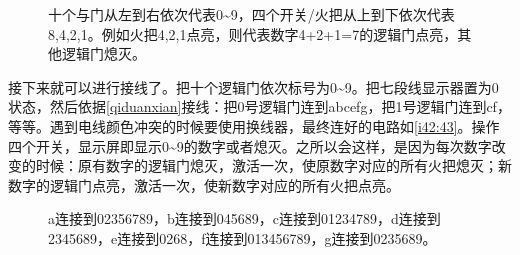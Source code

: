 \begin{figure}[!ht]
\begin{center}
\quad
{}
\end{center}
\caption{十个与门从左到右依次代表0\~{}9，四个开关/火把从上到下依次代表8,4,2,1。例如火把4,2,1点亮，则代表数字4+2+1=7的逻辑门点亮，其他逻辑门熄灭。}
\label{i36:37}
\end{figure}

接下来就可以进行接线了。把十个逻辑门依次标号为0\~{}9。把七段线显示器置为0状态，然后依据\autoref{qiduanxian}接线：把0号逻辑门连到abcefg，把1号逻辑门连到cf，等等。遇到电线颜色冲突的时候要使用换线器，最终连好的电路如\autoref{i42:43}。操作四个开关，显示屏即显示0\~{}9的数字或者熄灭。之所以会这样，是因为每次数字改变的时候：原有数字的逻辑门熄灭，激活一次，使原数字对应的所有火把熄灭；新数字的逻辑门点亮，激活一次，使新数字对应的所有火把点亮。

\begin{figure}[!ht]
\begin{center}
\subfloat{}
\end{center}
\caption{a连接到02356789，b连接到045689，c连接到01234789，d连接到2345689，e连接到0268，f连接到013456789，g连接到0235689。}
\label{i42:43}
\end{figure}


